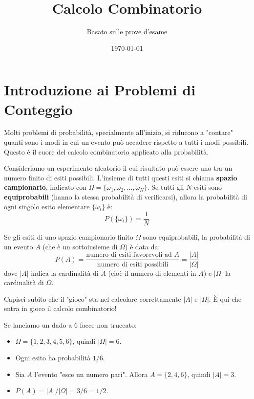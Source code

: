 

\title{Calcolo Combinatorio}
\author{Basato sulle prove d'esame}
\date{\today}



\maketitle
\tableofcontents
\newpage

\section{Introduzione ai Problemi di Conteggio}
Molti problemi di probabilità, specialmente all'inizio, si riducono a "contare" quanti sono i modi in cui un evento può accadere rispetto a tutti i modi possibili. Questo è il cuore del calcolo combinatorio applicato alla probabilità.

\begin{definition}
Consideriamo un esperimento aleatorio il cui risultato può essere uno tra un numero finito di esiti possibili. L'insieme di tutti questi esiti si chiama \textbf{spazio campionario}, indicato con $\Omega = \{\omega_1, \omega_2, \dots, \omega_N\}$.
Se tutti gli $N$ esiti sono \textbf{equiprobabili} (hanno la stessa probabilità di verificarsi), allora la probabilità di ogni singolo esito elementare $\{\omega_i\}$ è:
$$ P(\{\omega_i\}) = \frac{1}{N} $$
\end{definition}

\begin{theorem}
Se gli esiti di uno spazio campionario finito $\Omega$ sono equiprobabili, la probabilità di un evento $A$ (che è un sottoinsieme di $\Omega$) è data da:
$$ P(A) = \frac{\text{numero di esiti favorevoli ad } A}{\text{numero di esiti possibili}} = \frac{|A|}{|\Omega|} $$
dove $|A|$ indica la cardinalità di $A$ (cioè il numero di elementi in $A$) e $|\Omega|$ la cardinalità di $\Omega$.
\end{theorem}

\begin{remark}
Capisci subito che il "gioco" sta nel calcolare correttamente $|A|$ e $|\Omega|$. È qui che entra in gioco il calcolo combinatorio!
\end{remark}

\begin{example}
Se lanciamo un dado a 6 facce non truccato:
\begin{itemize}
    \item $\Omega = \{1, 2, 3, 4, 5, 6\}$, quindi $|\Omega|=6$.
    \item Ogni esito ha probabilità $1/6$.
    \item Sia $A$ l'evento "esce un numero pari". Allora $A = \{2, 4, 6\}$, quindi $|A|=3$.
    \item $P(A) = |A|/|\Omega| = 3/6 = 1/2$.
\end{itemize}
\end{example}

